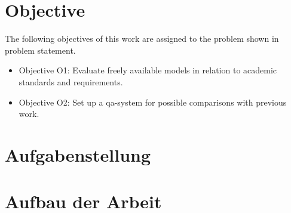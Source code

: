 \section{Objective}\label{objective}
The following objectives of this work are assigned to the problem shown in {problem statement}.
\begin{itemize}
  \item Objective O1: 
  Evaluate freely available models in relation to academic standards and requirements.
  \item Objective O2: 
  Set up a \ac{qa}-system for possible comparisons with previous work.
\end{itemize}
\section{Aufgabenstellung}



\section{Aufbau der Arbeit}
